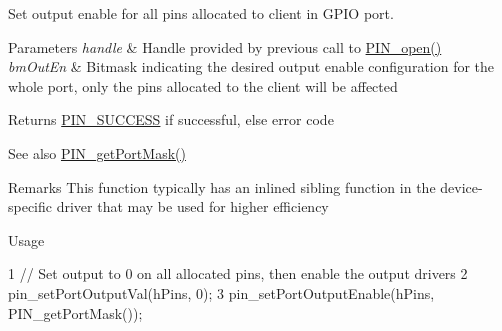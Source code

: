 Set output enable for all pins allocated to client in G\+P\+I\+O port. 


\begin{DoxyParams}{Parameters}
{\em handle} & Handle provided by previous call to \hyperlink{_p_i_n_8h_a731c5bb641ffeb064579432adfc8dba0}{P\+I\+N\+\_\+open()} \\
\hline
{\em bm\+Out\+En} & Bitmask indicating the desired output enable configuration for the whole port, only the pins allocated to the client will be affected \\
\hline
\end{DoxyParams}
\begin{DoxyReturn}{Returns}
\hyperlink{_p_i_n_8h_abe0ad59bbf09e51fe37195a5e70b23f6a5c9610fffc152c333036f2c2c7ee54e8}{P\+I\+N\+\_\+\+S\+U\+C\+C\+E\+S\+S} if successful, else error code 
\end{DoxyReturn}
\begin{DoxySeeAlso}{See also}
\hyperlink{_p_i_n_8h_a9f5b2367253b355909032742a7e6b5e0}{P\+I\+N\+\_\+get\+Port\+Mask()} 
\end{DoxySeeAlso}
\begin{DoxyRemark}{Remarks}
This function typically has an inlined sibling function in the device-\/specific driver that may be used for higher efficiency 
\end{DoxyRemark}
\begin{DoxyParagraph}{Usage}

\begin{DoxyCode}
1 // Set output to 0 on all allocated pins, then enable the output drivers
2 pin\_setPortOutputVal(hPins, 0);
3 pin\_setPortOutputEnable(hPins, PIN\_getPortMask());
\end{DoxyCode}
 
\end{DoxyParagraph}
